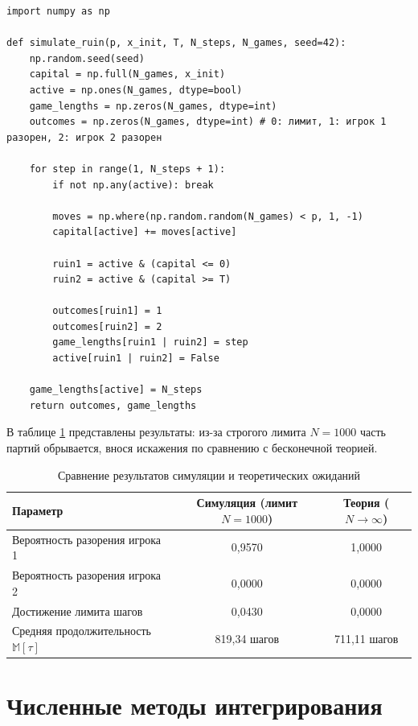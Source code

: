 \documentclass[a4paper,14pt]{extarticle}
\begin{document}
\begin{lstlisting}[caption={Моделирование случайного блуждания}, label={lst:lab3_code}]
import numpy as np

def simulate_ruin(p, x_init, T, N_steps, N_games, seed=42):
    np.random.seed(seed)
    capital = np.full(N_games, x_init)
    active = np.ones(N_games, dtype=bool)
    game_lengths = np.zeros(N_games, dtype=int)
    outcomes = np.zeros(N_games, dtype=int) # 0: лимит, 1: игрок 1 разорен, 2: игрок 2 разорен

    for step in range(1, N_steps + 1):
        if not np.any(active): break
        
        moves = np.where(np.random.random(N_games) < p, 1, -1)
        capital[active] += moves[active]

        ruin1 = active & (capital <= 0)
        ruin2 = active & (capital >= T)

        outcomes[ruin1] = 1
        outcomes[ruin2] = 2
        game_lengths[ruin1 | ruin2] = step
        active[ruin1 | ruin2] = False

    game_lengths[active] = N_steps
    return outcomes, game_lengths
\end{lstlisting}

В таблице \ref{tab:lab3_res} представлены результаты: из-за строгого лимита $N=1000$ часть партий обрывается, внося искажения по сравнению с бесконечной теорией.

\begin{table}[H]
    \centering
    \caption{Сравнение результатов симуляции и теоретических ожиданий}
    \label{tab:lab3_res}
    \begin{tabular}{lcc}
        \toprule
        \textbf{Параметр} & \textbf{Симуляция (лимит $N=1000$)} & \textbf{Теория ($N \to \infty$)} \\
        \midrule
        Вероятность разорения игрока 1 & 0,9570 & 1,0000 \\
        Вероятность разорения игрока 2 & 0,0000 & 0,0000 \\
        Достижение лимита шагов & 0,0430 & 0,0000 \\
        Средняя продолжительность $\mathbb{M}[\tau]$ & 819,34 шагов & 711,11 шагов \\
        \bottomrule
    \end{tabular}
\end{table}


\section{Численные методы интегрирования}
\end{document}
